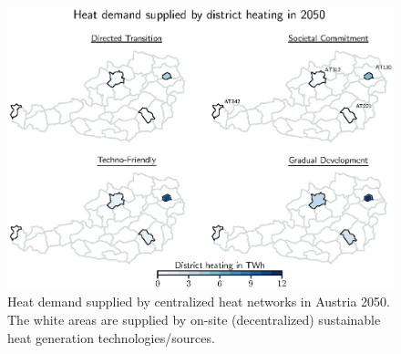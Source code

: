 \begin{figure}
	\centering
	\includegraphics[width=1\linewidth]{figures/4_Results/Fig-Heatmap/Heatmap.eps}
	\caption{Heat demand supplied by centralized heat networks in Austria 2050. The white areas are supplied by on-site (decentralized) sustainable heat generation technologies/sources.}
	\label{fig:res2}
\end{figure}


